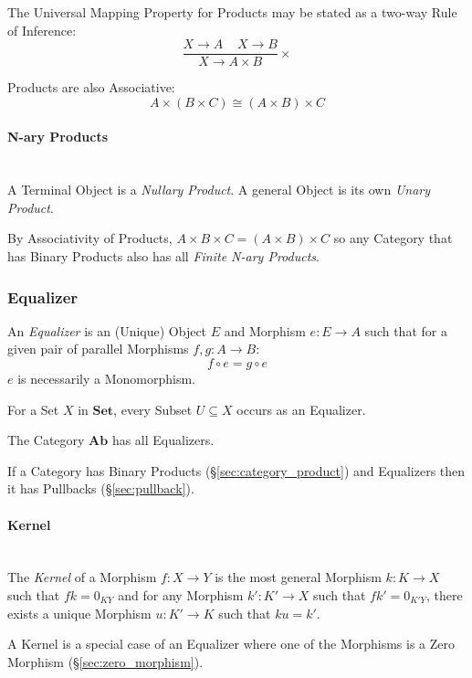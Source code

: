 The Universal Mapping Property for Products may be stated as a two-way
Rule of Inference:
\[
  {
    \frac{X \rightarrow A \;\;\;\; X \rightarrow B}
    {X \rightarrow A \times B}
  }\times
\]

Products are also Associative:
\[
  A \times (B \times C) \cong (A \times B) \times C
\]



\paragraph{N-ary Products}\label{sec:category_nary}
\hfill \\
A Terminal Object is a \emph{Nullary Product}. A general Object is its
own \emph{Unary Product}.

By Associativity of Products, $A \times B \times C = (A \times B)
\times C$ so any Category that has Binary Products also has all
\emph{Finite N-ary Products}.



\subsubsection{Equalizer}\label{sec:equalizer}

An \emph{Equalizer} is an (Unique) Object $E$ and Morphism $e: E
\rightarrow A$ such that for a given pair of parallel Morphisms $f,g :
A \rightarrow B$:
\[
  f \circ e = g \circ e
\]
$e$ is necessarily a Monomorphism.

For a Set $X$ in $\mathbf{Set}$, every Subset $U \subseteq X$ occurs
as an Equalizer.

The Category $\mathbf{Ab}$ has all Equalizers.

If a Category has Binary Products (\S\ref{sec:category_product}) and
Equalizers then it has Pullbacks (\S\ref{sec:pullback}).



\paragraph{Kernel}\label{sec:morphism_kernel}
\hfill \\

The \emph{Kernel} of a Morphism $f : X \rightarrow Y$ is the most
general Morphism $k : K \rightarrow X$ such that $fk = 0_{KY}$ and for
any Morphism $k' : K' \rightarrow X$ such that $fk' = 0_{K'Y}$, there
exists a unique Morphism $u : K' \rightarrow K$ such that $ku = k'$.

A Kernel is a special case of an Equalizer where one of the Morphisms
is a Zero Morphism (\S\ref{sec:zero_morphism}).



